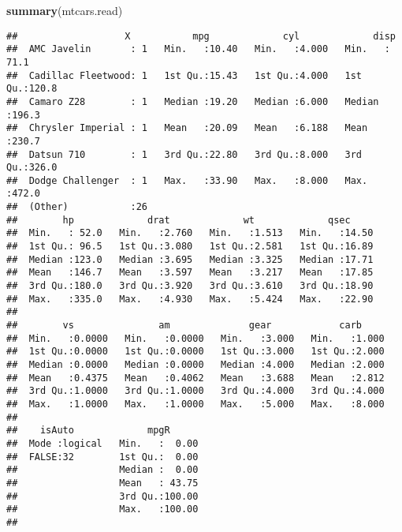 \documentclass[]{article}
\newenvironment{Shaded}{\begin{snugshade}}{\end{snugshade}}
\newcommand{\KeywordTok}[1]{\textcolor[rgb]{0.13,0.29,0.53}{\textbf{#1}}}
\newcommand{\NormalTok}[1]{#1}
\begin{document}
\begin{Shaded}
\begin{Highlighting}[]
\KeywordTok{summary}\NormalTok{(mtcars.read)}
\end{Highlighting}
\end{Shaded}

\begin{verbatim}
##                   X           mpg             cyl             disp      
##  AMC Javelin       : 1   Min.   :10.40   Min.   :4.000   Min.   : 71.1  
##  Cadillac Fleetwood: 1   1st Qu.:15.43   1st Qu.:4.000   1st Qu.:120.8  
##  Camaro Z28        : 1   Median :19.20   Median :6.000   Median :196.3  
##  Chrysler Imperial : 1   Mean   :20.09   Mean   :6.188   Mean   :230.7  
##  Datsun 710        : 1   3rd Qu.:22.80   3rd Qu.:8.000   3rd Qu.:326.0  
##  Dodge Challenger  : 1   Max.   :33.90   Max.   :8.000   Max.   :472.0  
##  (Other)           :26                                                  
##        hp             drat             wt             qsec      
##  Min.   : 52.0   Min.   :2.760   Min.   :1.513   Min.   :14.50  
##  1st Qu.: 96.5   1st Qu.:3.080   1st Qu.:2.581   1st Qu.:16.89  
##  Median :123.0   Median :3.695   Median :3.325   Median :17.71  
##  Mean   :146.7   Mean   :3.597   Mean   :3.217   Mean   :17.85  
##  3rd Qu.:180.0   3rd Qu.:3.920   3rd Qu.:3.610   3rd Qu.:18.90  
##  Max.   :335.0   Max.   :4.930   Max.   :5.424   Max.   :22.90  
##                                                                 
##        vs               am              gear            carb      
##  Min.   :0.0000   Min.   :0.0000   Min.   :3.000   Min.   :1.000  
##  1st Qu.:0.0000   1st Qu.:0.0000   1st Qu.:3.000   1st Qu.:2.000  
##  Median :0.0000   Median :0.0000   Median :4.000   Median :2.000  
##  Mean   :0.4375   Mean   :0.4062   Mean   :3.688   Mean   :2.812  
##  3rd Qu.:1.0000   3rd Qu.:1.0000   3rd Qu.:4.000   3rd Qu.:4.000  
##  Max.   :1.0000   Max.   :1.0000   Max.   :5.000   Max.   :8.000  
##                                                                   
##    isAuto             mpgR       
##  Mode :logical   Min.   :  0.00  
##  FALSE:32        1st Qu.:  0.00  
##                  Median :  0.00  
##                  Mean   : 43.75  
##                  3rd Qu.:100.00  
##                  Max.   :100.00  
## 
\end{verbatim}
\end{document}
